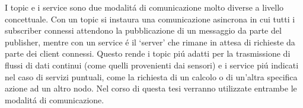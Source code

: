 I topic e i service sono due modalit\'{a} di comunicazione molto diverse a livello concettuale.
Con un topic si instaura una comunicazione asincrona in cui tutti i subscriber connessi attendono la pubblicazione 
di un messaggio da parte del publisher, mentre con un service \'{e} il `server' che rimane in attesa di richieste da 
parte dei client connessi. Questo rende i topic pi\'{u} adatti per la trasmissione di flussi di dati continui (come quelli 
provenienti dai sensori) e i service pi\'{u} indicati nel caso di servizi puntuali, come la richiesta di un calcolo o di un'altra 
specifica azione ad un altro nodo.
Nel corso di questa tesi verranno utilizzate entrambe le modalit\'{a} di comunicazione.